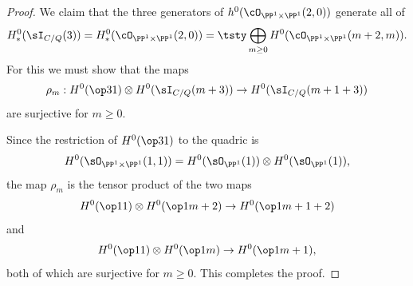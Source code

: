 \begin{proof}
We claim that the three generators of $h^0(\cO_{\PP^1\times \PP^1}(2, 0))$ generate all of
$$
H^0_{*}(\sI_{C/Q}(3)) = H^0_{*}(\cO_{\PP^1\times \PP^1}(2, 0)) =
\tsty
\bigoplus\limits_{m\geq 0}H^{0}(\cO_{\PP^1\times \PP^1}(m+2,m)).
$$
For this we must show that the maps
$$
\rho_{m}: H^{0}(\op31) \otimes H^0(\sI_{C/Q}(m+3)) \to H^0(\sI_{C/Q}(m+1+3))
$$
are surjective for $m\geq 0$.

Since the restriction
of $H^0(\op31)$ to the quadric is
$$
H^0(\sO_{\PP^1\times \PP^1}(1,1)) = H^{0}(\sO_{\PP^{1}}(1)) \otimes H^{0}(\sO_{\PP^{1}}(1)),
$$
the map $\rho_{m}$
is the tensor product of the two maps
$$
H^{0}(\op11)\otimes H^{0}(\op1{m+2}) \to H^{0}(\op1{m+1+2})
$$
and
$$
H^{0}(\op11)\otimes H^{0}(\op1{m}) \to H^{0}(\op1{m+1})
,
$$
both of which are surjective for $m\geq 0$. This completes the proof.
\end{proof}

